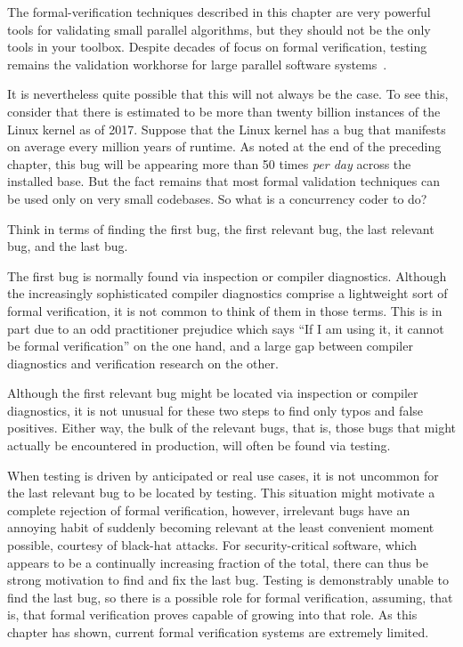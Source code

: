 The formal-verification techniques described in this chapter
are very powerful tools for validating small
parallel algorithms, but they should not be the only tools in your toolbox.
Despite decades of focus on formal verification, testing remains the
validation workhorse for large parallel software
systems~\cite{JonathanCorbet2006lockdep,DaveJones2011Trinity,PaulEMcKenney2016Formal}.

It is nevertheless quite possible that this will not always be the case.
To see this, consider that there is estimated to be more than twenty
billion instances of the Linux kernel as of 2017.
Suppose that the Linux kernel has a bug that manifests on average every million
years of runtime.
As noted at the end of the preceding chapter, this bug will be appearing
more than 50 times \emph{per day} across the installed base.
But the fact remains that most formal validation techniques can be used
only on very small codebases.
So what is a concurrency coder to do?

Think in terms of finding the first bug, the first relevant bug, the
last relevant bug, and the last bug.

The first bug is normally found via inspection or compiler diagnostics.
Although the increasingly sophisticated compiler diagnostics comprise
a lightweight sort of formal verification, it is not common to think of
them in those terms.
This is in part due to an odd practitioner prejudice which says ``If I am
using it, it cannot be formal verification'' on the one hand, and a large
gap between compiler diagnostics and verification research on the other.

Although the first relevant bug might be located via inspection or
compiler diagnostics, it is not unusual for these two steps to find
only typos and false positives.
Either way, the bulk of the relevant bugs, that is, those bugs that
might actually be encountered in production, will often be found via testing.

When testing is driven by anticipated or real use cases, it is not
uncommon for the last relevant bug to be located by testing.
This situation might motivate a complete rejection of formal verification,
however, irrelevant bugs have an annoying habit of suddenly becoming relevant
at the least convenient moment possible, courtesy of black-hat attacks.
For security-critical software, which appears to be a continually
increasing fraction of the total, there can thus be strong motivation
to find and fix the last bug.
Testing is demonstrably unable to find the last bug, so there is a
possible role for formal verification, assuming, that is, that
formal verification proves capable of growing into that role.
As this chapter has shown, current formal verification systems are
extremely limited.

